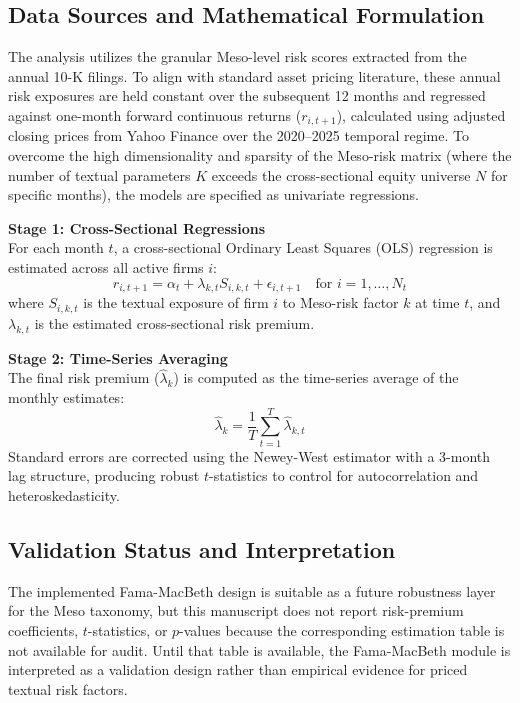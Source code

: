 \documentclass[11pt, a4paper]{article}
\begin{document}
\subsection{Data Sources and Mathematical Formulation}
The analysis utilizes the granular Meso-level risk scores extracted from the annual 10-K filings. To align with standard asset pricing literature, these annual risk exposures are held constant over the subsequent 12 months and regressed against one-month forward continuous returns ($r_{i, t+1}$), calculated using adjusted closing prices from Yahoo Finance over the 2020--2025 temporal regime. To overcome the high dimensionality and sparsity of the Meso-risk matrix (where the number of textual parameters $K$ exceeds the cross-sectional equity universe $N$ for specific months), the models are specified as univariate regressions.

\textbf{Stage 1: Cross-Sectional Regressions} \\
For each month $t$, a cross-sectional Ordinary Least Squares (OLS) regression is estimated across all active firms $i$:
\begin{equation}
r_{i, t+1} = \alpha_t + \lambda_{k,t} S_{i,k,t} + \epsilon_{i,t+1} \quad \text{for } i = 1, \dots, N_t
\end{equation}
where $S_{i,k,t}$ is the textual exposure of firm $i$ to Meso-risk factor $k$ at time $t$, and $\lambda_{k,t}$ is the estimated cross-sectional risk premium.

\textbf{Stage 2: Time-Series Averaging} \\
The final risk premium ($\hat{\lambda}_k$) is computed as the time-series average of the monthly estimates:
\begin{equation}
\hat{\lambda}_k = \frac{1}{T} \sum_{t=1}^T \hat{\lambda}_{k,t}
\end{equation}
Standard errors are corrected using the Newey-West estimator with a 3-month lag structure, producing robust $t$-statistics to control for autocorrelation and heteroskedasticity.

\subsection{Validation Status and Interpretation}
The implemented Fama-MacBeth design is suitable as a future robustness layer for the Meso taxonomy, but this manuscript does not report risk-premium coefficients, $t$-statistics, or $p$-values because the corresponding estimation table is not available for audit. Until that table is available, the Fama-MacBeth module is interpreted as a validation design rather than empirical evidence for priced textual risk factors.
\end{document}
